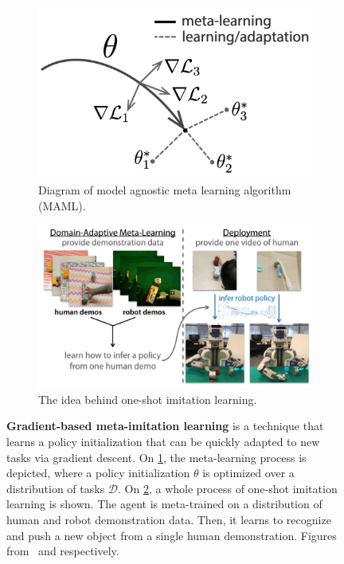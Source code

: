 \begin{figure}
    \centering
   \begin{subfigure}[b]{0.49\linewidth}
        \centering
        \includegraphics[width=\linewidth]{figures/related_work/maml}
        \caption{Diagram of model agnostic meta learning algorithm (MAML).}
        \label{fig:maml}
    \end{subfigure}
    \hfill
    \begin{subfigure}[b]{0.49\linewidth}
        \centering
        \includegraphics[width=\linewidth]{figures/related_work/one_shot_human}
        \caption{The idea behind one-shot imitation learning.}
        \label{fig:oneshot-human}
    \end{subfigure}
    \caption{\textbf{Gradient-based meta-imitation learning} is a technique that learns a policy initialization that can be quickly adapted to new tasks via gradient descent.
    On \ref{fig:maml}, the meta-learning process is depicted, where a policy initialization $\theta$ is optimized over a distribution of tasks $\mathcal{D}$.
    On \ref{fig:oneshot-human}, a whole process of one-shot imitation learning is shown.
    The agent is meta-trained on a distribution of human and robot demonstration data.
    Then, it learns to recognize and push a new object from a single human demonstration.
    Figures from~\cite{finn2017} and \cite{Yu2018OneShotIF} respectively.}
    \label{fig:maml-mil}
\end{figure}

